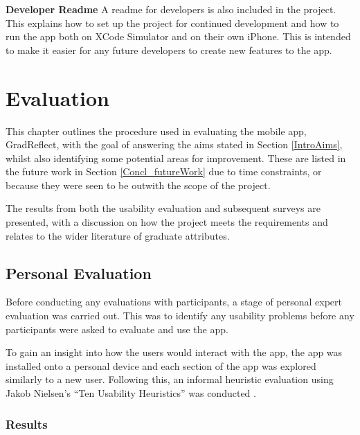 \documentclass{l4proj}
\begin{document}
\textbf{Developer Readme} A readme for developers is also included in the project. This explains how to set up the project for continued development and how to run the app both on XCode Simulator and on their own iPhone. This is intended to make it easier for any future developers to create new features to the app. 

\chapter{Evaluation} \label{evaluation}

This chapter outlines the procedure used in evaluating the mobile app, GradReflect, with the goal of answering the aims stated in Section \ref{IntroAims}, whilst also identifying some potential areas for improvement. These are listed in the future work in Section \ref{Concl_futureWork} due to time constraints, or because they were seen to be outwith the scope of the project. 

The results from both the usability evaluation and subsequent surveys are presented, with a discussion on how the project meets the requirements and relates to the wider literature of graduate attributes.

\section{Personal Evaluation}

Before conducting any evaluations with participants, a stage of personal expert evaluation was carried out. This was to identify any usability problems before any participants were asked to evaluate and use the app. 
 
To gain an insight into how the users would interact with the app, the app was installed onto a personal device and each section of the app was explored similarly to a new user. Following this, an informal heuristic evaluation using Jakob Nielsen’s “Ten Usability Heuristics” was conducted \citep{Nielsen10}. 

\subsection{Results}
\end{document}
